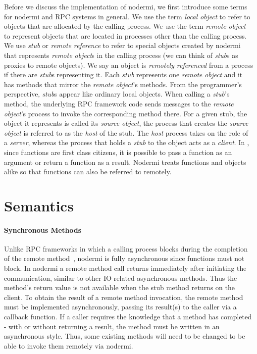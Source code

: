 Before we discuss the implementation of nodermi,
we first introduce some terms for nodermi and
RPC systems in general.
We use the term \emph{local object}
to refer to objects that are allocated by the calling process.
We use the term \emph{remote object} to represent objects that are
located in processes other than the calling process.
We use \emph{stub} or \emph{remote reference} to refer to special objects created
by nodermi that represents \emph{remote object}s in the calling process
(we can think of \emph{stub}s as proxies to remote objects).
We say an object is \emph{remotely referenced} from a process
if there are \emph{stub}s representing it.
Each \emph{stub} represents one \emph{remote object} and
it has methods that mirror the \emph{remote object}'s methods.
From the programmer's perspective,
\emph{stub}s appear like ordinary local objects.
When calling a \emph{stub}'s method, the underlying
RPC framework code sends messages to the \emph{remote object}'s process
to invoke the corresponding method there.
For a given stub,
the object it represents is called its \emph{source object},
the process that creates the \emph{source object}
is referred to as the \emph{host} of the stub.
The \emph{host} process takes on the role of a \emph{server},
whereas the process that holds a \emph{stub} to the object acts as a \emph{client}.
In \js{}, since functions are first class citizens, it is possible
to pass a function as an argument or return a function as a result.
Nodermi treats functions and objects alike so that functions can also be
referred to remotely.


\section{Semantics}
\label{sec:semantics}

\nodermiexamplefig{}

\paragraph{Synchronous Methods}
Unlike RPC frameworks in which a calling process blocks during the
completion of the remote method~\cite{birrell1984implementing},
nodermi is fully asynchronous since \js{} functions must not block.
In nodermi a remote method call returns immediately after initiating the communication,
similar to other IO-related asynchronous methods.
Thus the method's return value is not available when the stub method returns on the client.
To obtain the result of a remote method invocation,
the remote method must be implemented asynchronously,
passing its result(s) to the caller via a callback function.
If a caller requires the knowledge that a method has completed - with or without
returning a result, the method must be written in an asynchronous style.
Thus, some existing methods will need to be changed to be able to invoke them
remotely via nodermi.






